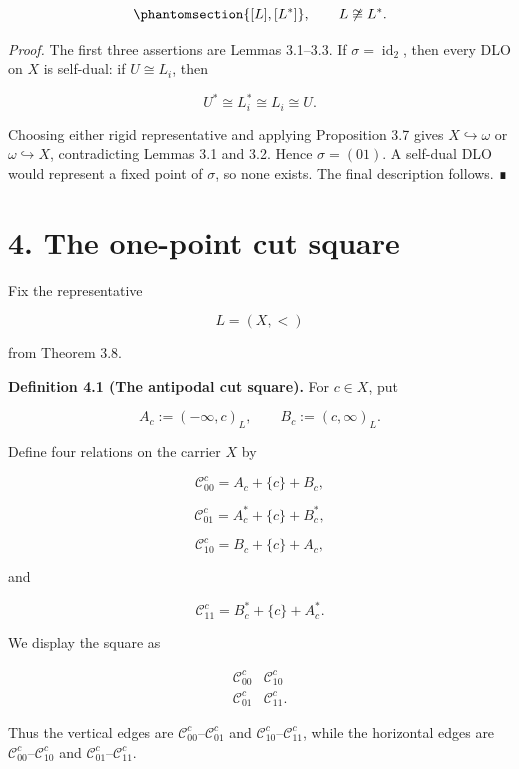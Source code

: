 \documentclass[
  english,
  11pt,
  reqno]{amsart}
\newcounter{none} %
\begin{document}
\begin{equation}\protect\phantomsection\label{eq:exact-two-residual}{
   \{[L],[L^*]\},
   \qquad
   L\not\cong L^*.
}\end{equation}

\emph{Proof.} The first three assertions are Lemmas 3.1--3.3. If
\(\sigma=\operatorname{id}_2\), then every DLO on \(X\) is self-dual: if
\(U\cong L_i\), then

\[
U^*\cong L_i^*\cong L_i\cong U.
\]

Choosing either rigid representative and applying Proposition 3.7 gives
\(X\hookrightarrow\omega\) or \(\omega\hookrightarrow X\), contradicting
Lemmas 3.1 and 3.2. Hence \(\sigma=(01)\). A self-dual DLO would
represent a fixed point of \(\sigma\), so none exists. The final
description follows. ∎

\protect{}\label{sec:cut-square}

\section{4. The one-point cut square}\label{the-one-point-cut-square}

Fix the representative

\[
L=(X,<)
\]

from Theorem 3.8.

\protect{}\label{def:4-1-cut-square}

\textbf{Definition 4.1 (The antipodal cut square).} For \(c\in X\), put

\[
A_c:=(-\infty,c)_L,
\qquad
B_c:=(c,\infty)_L.
\]

Define four relations on the carrier \(X\) by

\[
\mathcal C_{00}^c
=
A_c+\{c\}+B_c,
\]

\[
\mathcal C_{01}^c
=
A_c^*+\{c\}+B_c^*,
\]

\[
\mathcal C_{10}^c
=
B_c+\{c\}+A_c,
\]

and

\[
\mathcal C_{11}^c
=
B_c^*+\{c\}+A_c^*.
\]

We display the square as

\[
\begin{matrix}
\mathcal C_{00}^c & \mathcal C_{10}^c\\
\mathcal C_{01}^c & \mathcal C_{11}^c.
\end{matrix}
\]

Thus the vertical edges are \(\mathcal C_{00}^c\)--\(\mathcal C_{01}^c\)
and \(\mathcal C_{10}^c\)--\(\mathcal C_{11}^c\), while the horizontal
edges are \(\mathcal C_{00}^c\)--\(\mathcal C_{10}^c\) and
\(\mathcal C_{01}^c\)--\(\mathcal C_{11}^c\).
\end{document}
